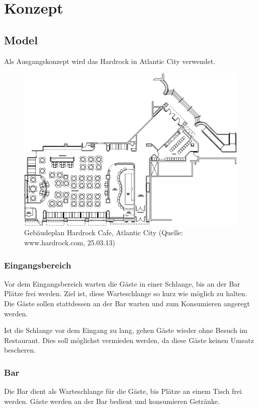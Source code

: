 \documentclass[ngerman,a4paper,12pt]{scrreprt}
\begin{document}
\tableofcontents


\chapter{Konzept}


\section{Model}
Als Ausgangskonzept wird das Hardrock in Atlantic City verwendet.
\begin{figure}[htp]
	\centering
		\includegraphics[width=1\textwidth]{img/hardrock-plan.png}
		\caption[Gebäudeplan Hardrock]{Gebäudeplan Hardrock Cafe, Atlantic City (Quelle: www.hardrock.com, 25.03.13)}
		\label{planHardrock}
\end{figure}

\subsection{Eingangsbereich}
Vor dem Eingangsbereich warten die Gäste in einer Schlange, bis an der Bar Plätze frei werden. Ziel ist, diese Warteschlange so kurz wie möglich zu halten. Die Gäste sollen stattdessen an der Bar warten und zum Konsumieren angeregt werden.

Ist die Schlange vor dem Eingang zu lang, gehen Gäste wieder ohne Besuch im Restaurant. Dies soll möglichst vermieden werden, da diese Gäste keinen Umsatz bescheren.

\subsection{Bar}
Die Bar dient als Warteschlange für die Gäste, bis Plätze an einem Tisch frei werden. Gäste werden an der Bar bedient und konsumieren Getränke.
\end{document}
